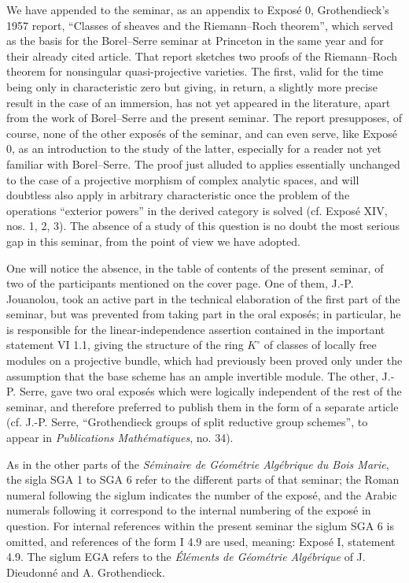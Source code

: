 We have appended to the seminar, as an appendix to Exposé 0, Grothendieck's 1957 report, ``Classes of sheaves and the Riemann--Roch theorem'', which served as the basis for the Borel--Serre seminar at Princeton in the same year and for their already cited article. That report sketches two proofs of the Riemann--Roch theorem for nonsingular quasi-projective varieties. The first, valid for the time being only in characteristic zero but giving, in return, a slightly more precise result in the case of an immersion, has not yet appeared in the literature, apart from the work of Borel--Serre and the present seminar. The report presupposes, of course, none of the other exposés of the seminar, and can even serve, like Exposé 0, as an introduction to the study of the latter, especially for a reader not yet familiar with Borel--Serre. The proof just alluded to applies essentially unchanged to the case of a projective morphism of complex analytic spaces, and will doubtless also apply in arbitrary characteristic once the problem of the operations ``exterior powers'' in the derived category is solved (cf. Exposé XIV, nos. 1, 2, 3). The absence of a study of this question is no doubt the most serious gap in this seminar, from the point of view we have adopted.

One will notice the absence, in the table of contents of the present seminar, of two of the participants mentioned on the cover page. One of them, J.-P. Jouanolou, took an active part in the technical elaboration of the first part of the seminar, but was prevented from taking part in the oral exposés; in particular, he is responsible for the linear-independence assertion contained in the important statement VI 1.1, giving the structure of the ring $K^\circ$ of classes of locally free modules on a projective bundle, which had previously been proved only under the assumption that the base scheme has an ample invertible module. The other, J.-P. Serre, gave two oral exposés which were logically independent of the rest of the seminar, and therefore preferred to publish them in the form of a separate article (cf. J.-P. Serre, ``Grothendieck groups of split reductive group schemes'', to appear in \emph{Publications Mathématiques}, no. 34).

As in the other parts of the \emph{Séminaire de Géométrie Algébrique du Bois Marie}, the sigla SGA 1 to SGA 6 refer to the different parts of that seminar; the Roman numeral following the siglum indicates the number of the exposé, and the Arabic numerals following it correspond to the internal numbering of the exposé in question. For internal references within the present seminar the siglum SGA 6 is omitted, and references of the form I 4.9 are used, meaning: Exposé I, statement 4.9. The siglum EGA refers to the \emph{Éléments de Géométrie Algébrique} of J. Dieudonné and A. Grothendieck.

